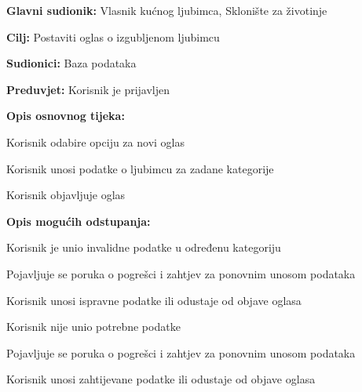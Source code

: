 					\noindent {}
					\begin{packed_item}
						
						\item \textbf{Glavni sudionik: }Vlasnik kućnog ljubimca, Sklonište za životinje
						\item  \textbf{Cilj:} Postaviti oglas o izgubljenom ljubimcu
						\item  \textbf{Sudionici:} Baza podataka
						\item  \textbf{Preduvjet:} Korisnik je prijavljen
						\item  \textbf{Opis osnovnog tijeka:}
						
						\item[] \begin{packed_enum}
							
							\item Korisnik odabire opciju za novi oglas
							\item Korisnik unosi podatke o ljubimcu za zadane kategorije
							\item Korisnik objavljuje oglas
						\end{packed_enum}
						
						\item  \textbf{Opis mogućih odstupanja:}
						
						\item[] \begin{packed_item}
							
							\item[2.a] Korisnik je unio invalidne podatke u određenu kategoriju
							\item[] \begin{packed_enum}
								
								\item Pojavljuje se poruka o pogrešci i zahtjev za ponovnim unosom podataka
								\item Korisnik unosi ispravne podatke ili odustaje od objave oglasa
								
							\end{packed_enum}
							\item[2.b] Korisnik nije unio potrebne podatke
							\item[] \begin{packed_enum}
								
								\item Pojavljuje se poruka o pogrešci i zahtjev za ponovnim unosom podataka
								\item Korisnik unosi zahtijevane podatke ili odustaje od objave oglasa
								
							\end{packed_enum}
						\end{packed_item}
					\end{packed_item}
